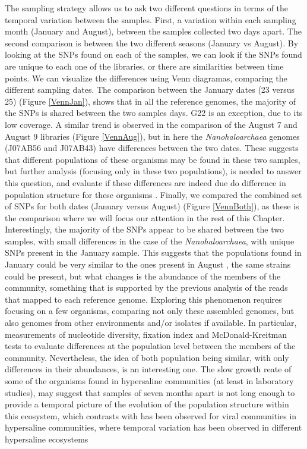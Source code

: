 The sampling strategy allows us to ask two different questions in terms of the temporal variation between the samples. First, a variation within each sampling month (January and August), between the samples collected two days apart. The second comparison is between the two different seasons (January vs August). By looking at the SNPs found on each of the samples, we can look if the SNPs found are unique to each one of the libraries, or there are similarities between time points. We can visualize the differences using Venn diagramas, comparing the different sampling dates. The comparison between the January dates (23 versus 25) (Figure \ref{VennJan}), shows that in all the reference genomes, the majority of the SNPs is shared between the two samples days. G22 is an exception, due to its low coverage. A similar trend is observed in the comparison of the August 7 and August 9 libraries (Figure \ref{VennAug}), but in here the \textit{Nanohaloarchaea} genomes (J07AB56 and J07AB43) have differences between the two dates. These suggests that different populations of these organisms may be found in these two samples, but further analysis (focusing only in these two populations), is needed to answer this question, and evaluate if these differences are indeed due do difference in population structure for these organisms \cite{Schloissnig:2012hx,Shapiro:hi,Vos:2011ux}. Finally, we compared the combined set of SNPs for both dates (January versus August) (Figure \ref{VennBoth}), as these is the comparison where we will focus our attention in the rest of this Chapter. Interestingly, the majority of the SNPs appear to be shared between the two samples, with small differences in the case of the \textit{Nanohaloarchaea}, with unique SNPs present in the January sample. This suggests that the populations found in January could be very similar to the ones present in August \cite{Doolittle:2012hf}, the same strains could be present, but what changes is the abundance of the members of the community, something that is supported by the previous analysis of the reads that mapped to each reference genome. Exploring this phenomenon requires focusing on a few organisms, comparing not only these assembled genomes, but also genomes from other environments and/or isolates if available. In particular, measurements of nucleotide diversity, fixation index and McDonald-Kreitman tests \cite{Schloissnig:2012hx,Simmons:2008by} to evaluate differences at the population level between the members of the community. Nevertheless, the idea of both population being similar, with only differences in their abundances, is an interesting one. The slow growth reate of some of the organisms found in hypersaline communities \cite{DyallSmith:2011tu} (at least in laboratory studies), may suggest that samples of seven months apart is not long enough to provide a temporal picture of the evolution of the population structure within this ecosystem, which contrasts with has been observed for viral communities in hypersaline communities, where temporal variation has been observed in different hypersaline ecosystems \cite{RodriguezBrito:2010in,Emerson:2012gh} 

